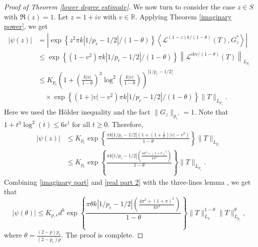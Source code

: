 \documentclass{amsbook}
\theoremstyle{definition}
\theoremstyle{remark}
\numberwithin{section}{chapter}
\numberwithin{equation}{chapter}
\newcommand{\1}{\mathbf{1}}
\begin{document}
\begin{proof}[Proof of Theorem \ref{lower degree estimate}]
We now turn to consider the case $z\in S$ with $\Re(z)=1$. Let $z=1+iv$ with $v\in \mathbb{R}$.  Applying Theorem \ref{imaginary power}, we get
\begin{equation}\label{real part 1}
\begin{split}
|\psi(z)|&=\left|\exp\left\{z^{2}\pi k|1/p_{\epsilon}-1/2|/(1-\theta)\right\}\left\langle \mathcal{L}^{(1-z)k/(1-\theta)}(T),G^{*}_{z}\right\rangle\right|\\
&\leq \exp\left\{(1-v^{2})\pi k|1/p_{\epsilon}-1/2|/(1-\theta)\right\} \left\|\mathcal{L}^{ikv/(1-\theta)}(T)\right\|_{L_{p_{\epsilon}}}\\
&\leq K_{p_{\epsilon}} \left(1+\left(\frac{k|v|}{1-\theta}\right)^{3}\log^{2}\left(\frac{k|v|}{1-\theta}\right)\right)^{{|1/p_{\epsilon}-1/2|}}\\
&\quad\times  \exp\left\{(1+|v|-v^{2})\pi k|1/p_{\epsilon}-1/2|/(1-\theta)\right\}\|T\|_{L_{p_{\epsilon}}}.
\end{split}
\end{equation}
Here we used the H\"{o}lder inequality and the fact $\|G_z\|_{p_{\epsilon}'}=1$. Note that $1+t^{3}\log^{2}(t)\leq 6e^{t}$ for all $t\geq 0$. Therefore, 
\begin{equation}\label{real part 2}
\begin{split}
|\psi(z)|&\leq K_{p_{\epsilon}}\exp\left\{\frac{\pi k|1/p_{\epsilon}-1/2|\left(1+(1+\frac{1}{\pi})|v|-v^{2}\right)}{1-\theta}\right\}\|T\|_{L_{p_{\varepsilon}}}\\
&\leq K_{p_{\epsilon}}\exp\left\{\frac{\pi k|1/p_{\epsilon}-1/2|\left(\frac{4\pi^{2}+(1+\pi)^{2}}{4\pi^{2}}\right)}{1-\theta}\right\}\|T\|_{L_{p_{\epsilon}}}.
\end{split}
\end{equation}
Combining \eqref{imaginary part} and \eqref{real part 2} with the three-lines lemma \cite[Lemma 1.3.5]{Gr2014}, we get that
\[
|\psi(\theta)|\leq K_{p,\epsilon}d^{k}\exp\left\{\frac{\pi\theta k|1/p_{\epsilon}-1/2|\left(\frac{4\pi^{2}+(1+\pi)^{2}}{4\pi^{2}}\right)}{1-\theta}\right\}\|T\|^{1-\theta}_{L_2}\|T\|^{\theta}_{L_{p_{\epsilon}}},
\]
where $\theta=\frac{(2-p)p_{\epsilon}}{(2-p_{\epsilon})p}$. The proof is complete.
\end{proof}
\end{document}
